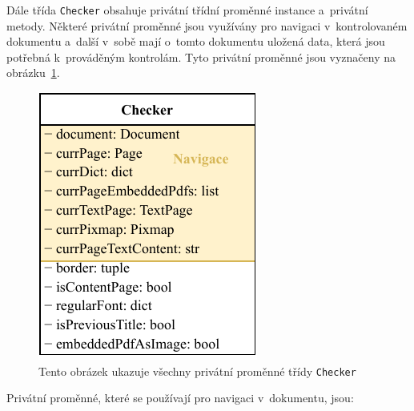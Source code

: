 Dále třída \texttt{Checker} obsahuje privátní třídní proměnné instance
a~privátní metody. 
Některé privátní proměnné jsou využívány pro navigaci v~kontrolovaném dokumentu
a~další v~sobě mají o~tomto dokumentu uložená data, která jsou potřebná
k~prováděným kontrolám. Tyto privátní proměnné jsou vyznačeny na
obrázku~\ref{pic_class_Checker_private}. 
\begin{figure}[H]
    \centering
    \includegraphics[width=0.4\linewidth]{obrazky-figures/class_Checker_private.pdf}
    \caption{Tento obrázek ukazuje všechny privátní proměnné třídy \texttt{Checker}}
    \label{pic_class_Checker_private}
\end{figure}
Privátní proměnné, které se používají pro navigaci v~dokumentu, jsou:
